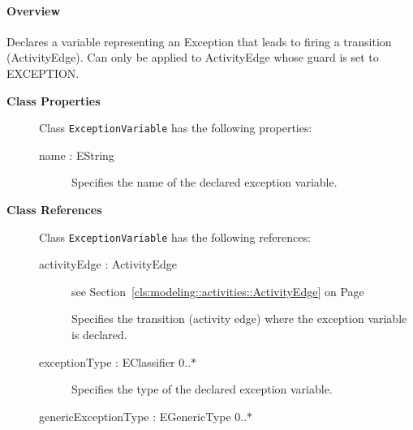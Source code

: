 \paragraph{Overview}

	
			
Declares a variable representing an Exception that leads to firing a transition (ActivityEdge). Can only be applied to ActivityEdge whose guard is set to EXCEPTION.	
		
	


\begin{description}

	\item[\textbf{Class Properties}] Class \texttt{ExceptionVariable} has the following properties:
	\begin{description}
\item[name : EString 	]
\hspace{\fill}
\nopagebreak


	
			
Specifies the name of the declared exception variable.	
		
	
	\end{description}
	
	\item[\textbf{Class References}] Class \texttt{ExceptionVariable} has the following references:
	\begin{description}
\item[activityEdge : ActivityEdge 	]
see Section~\ref{cls:modeling::activities::ActivityEdge} on Page~\pageref{cls:modeling::activities::ActivityEdge}\hspace{\fill}
\nopagebreak


	
			
Specifies the transition (activity edge) where the exception variable is declared.	
		
	
\item[exceptionType : EClassifier 			0..$*$]
\hspace{\fill}
\nopagebreak


	
			
Specifies the type of the declared exception variable.	
		
	
\item[genericExceptionType : EGenericType 			0..$*$]
\hspace{\fill}
\nopagebreak


	
	\end{description}
	

\end{description}

